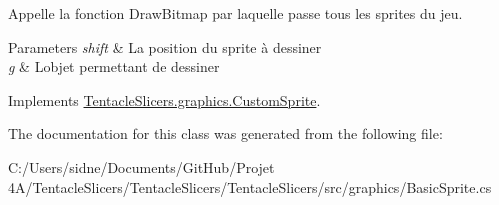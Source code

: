 Appelle la fonction Draw\+Bitmap par laquelle passe tous les sprites du jeu. 


\begin{DoxyParams}{Parameters}
{\em shift} & La position du sprite à dessiner \\
\hline
{\em g} & L\textquotesingle{}objet permettant de dessiner \\
\hline
\end{DoxyParams}


Implements \hyperlink{class_tentacle_slicers_1_1graphics_1_1_custom_sprite_a2a673911c8438b95e4f1f50f06ccaa41}{Tentacle\+Slicers.\+graphics.\+Custom\+Sprite}.



The documentation for this class was generated from the following file\+:\begin{DoxyCompactItemize}
\item 
C\+:/\+Users/sidne/\+Documents/\+Git\+Hub/\+Projet 4\+A/\+Tentacle\+Slicers/\+Tentacle\+Slicers/\+Tentacle\+Slicers/src/graphics/Basic\+Sprite.\+cs\end{DoxyCompactItemize}
